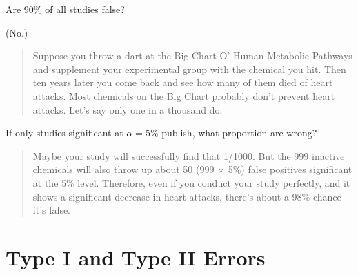 \begin{frame}{Are 90\% of all studies false?}

        (No.)

    \vspace{2em}
    \pause

    \begin{quote}
        \small
        Suppose you throw a dart at the Big Chart O' Human Metabolic Pathways and supplement your experimental group with the chemical you hit. Then ten years later you come back and see how many of them died of heart attacks.
        Most chemicals on the Big Chart probably don't prevent heart attacks. Let's say only one in a thousand do. 
    \end{quote}

    \vspace{1em}

    If only studies significant at $\alpha=5\%$ publish,
    what proportion are wrong?

    \vspace{1em}
        
    \begin{quote}
        \pause Maybe your study will successfully find that 1/1000. But the 999 inactive chemicals will also throw up about 50 (999 $\times$ 5\%) false positives significant at the 5\% level. Therefore, even if you conduct your study perfectly, and it shows a significant decrease in heart attacks, there's about a 98\% chance it's false.
    \end{quote}


\end{frame}

\section{Type I and Type II Errors}


